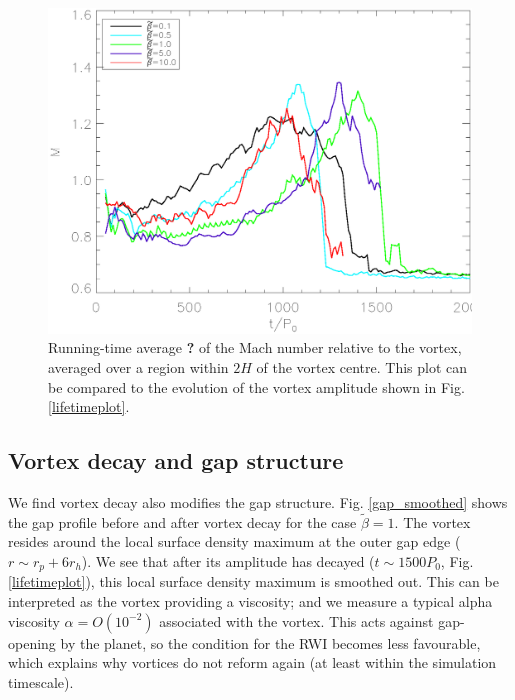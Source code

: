 \begin{figure}
  \includegraphics[width=\linewidth]{figures/mach}
  \caption{Running-time average {\bf ?} of the Mach number relative to
    the vortex, averaged over a region within $2H$ of the  
    vortex centre. This plot can be compared to the evolution of the
    vortex amplitude shown in Fig. \ref{lifetimeplot}.
    \label{machplot}}
\end{figure}

\subsection{Vortex decay and gap structure}  
We find vortex decay also modifies the gap
structure. Fig. \ref{gap_smoothed} shows the gap profile before and
after vortex decay for the case $\tilde{\beta}=1$. The vortex resides
around the local surface density maximum at the outer gap edge ($r\sim r_p +
6r_h$). We see that after its amplitude has decayed ($t\sim1500P_0$,   
Fig. \ref{lifetimeplot}), this local surface density maximum is 
smoothed out.           
This can be interpreted as the vortex providing a viscosity;  
and we measure a typical alpha viscosity $\alpha = O(10^{-2})$
associated with the vortex. This acts against gap-opening
by the planet, so the condition for the RWI
becomes less favourable, which explains why vortices do not
reform again (at least within the simulation timescale). 

